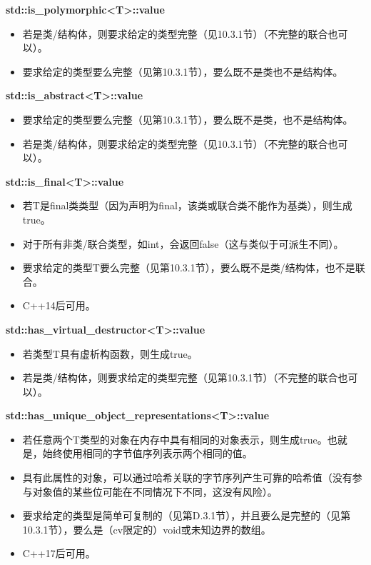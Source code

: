 \textbf{std::is\_polymorphic<T>::value}

\begin{itemize}
\item 
若是类/结构体，则要求给定的类型完整（见10.3.1节）（不完整的联合也可以）。

\item 
要求给定的类型要么完整（见第10.3.1节），要么既不是类也不是结构体。
\end{itemize}

\textbf{std::is\_abstract<T>::value}

\begin{itemize}
\item 
要求给定的类型要么完整（见第10.3.1节），要么既不是类，也不是结构体。

\item 
若是类/结构体，则要求给定的类型完整（见10.3.1节）（不完整的联合也可以）。
\end{itemize}

\textbf{std::is\_final<T>::value}

\begin{itemize}
\item 
若T是final类类型（因为声明为final，该类或联合类不能作为基类），则生成true。

\item 
对于所有非类/联合类型，如int，会返回false（这与类似于可派生不同）。

\item 
要求给定的类型T要么完整（见第10.3.1节），要么既不是类/结构体，也不是联合。

\item 
C++14后可用。
\end{itemize}

\textbf{std::has\_virtual\_destructor<T>::value}

\begin{itemize}
\item 
若类型T具有虚析构函数，则生成true。

\item 
若是类/结构体，则要求给定的类型完整（见第10.3.1节）（不完整的联合也可以）。
\end{itemize}

\textbf{std::has\_unique\_object\_representations<T>::value}

\begin{itemize}
\item 
若任意两个T类型的对象在内存中具有相同的对象表示，则生成true。也就是，始终使用相同的字节值序列表示两个相同的值。

\item 
具有此属性的对象，可以通过哈希关联的字节序列产生可靠的哈希值（没有参与对象值的某些位可能在不同情况下不同，这没有风险）。

\item 
要求给定的类型是简单可复制的（见第D.3.1节），并且要么是完整的（见第10.3.1节），要么是（cv限定的）void或未知边界的数组。

\item 
C++17后可用。
\end{itemize}

